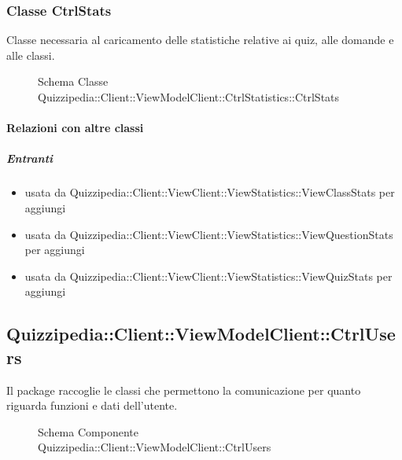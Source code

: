 \subsubsection{Classe CtrlStats}
Classe necessaria al caricamento delle statistiche relative ai quiz, alle domande e alle classi.
\begin{figure}[H]
\centering
\noindent{}
\caption[Schema Classe CtrlStats]{Schema Classe Quizzipedia::Client::ViewModelClient::CtrlStatistics::CtrlStats}
\end{figure}
\paragraph{Relazioni con altre classi}
\subparagraph{Entranti}
\begin{itemize}
\item usata da Quizzipedia::Client::ViewClient::ViewStatistics::ViewClassStats per aggiungi
\item usata da Quizzipedia::Client::ViewClient::ViewStatistics::ViewQuestionStats per aggiungi
\item usata da Quizzipedia::Client::ViewClient::ViewStatistics::ViewQuizStats per aggiungi
\end{itemize}
\subsection{Quizzipedia::Client::ViewModelClient::CtrlUsers}
Il package raccoglie le classi che permettono la comunicazione per quanto riguarda funzioni e dati dell'utente.
\begin{figure}[H]
\centering
\noindent{}
\caption[Schema Componente Quizzipedia::Client::ViewModelClient::CtrlUsers]{Schema Componente Quizzipedia::Client::ViewModelClient::CtrlUsers}
\end{figure}
